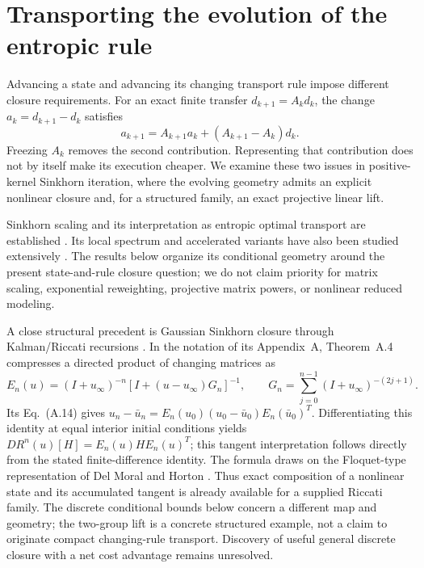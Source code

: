 \section{Transporting the evolution of the entropic rule}
\label{sec:entropic-evolution}
Advancing a state and advancing its changing transport rule impose different
closure requirements. For an exact finite transfer $d_{k+1}=A_kd_k$, the
change $a_k=d_{k+1}-d_k$ satisfies
\begin{equation}
 a_{k+1}=A_{k+1}a_k+(A_{k+1}-A_k)d_k.
 \label{eq:evolution-cocycle}
\end{equation}
Freezing $A_k$ removes the second contribution. Representing that contribution
does not by itself make its execution cheaper. We examine these two issues
in positive-kernel Sinkhorn iteration, where the evolving geometry admits
an explicit nonlinear closure and, for a structured family, an exact
projective linear lift.

Sinkhorn scaling and its interpretation as entropic optimal transport are
established \cite{peyre}. Its local spectrum and accelerated variants have
also been studied extensively \cite{lehmann}. The results below organize
its conditional geometry around the present state-and-rule closure question;
we do not claim priority for matrix scaling, exponential reweighting,
projective matrix powers, or nonlinear reduced modeling.

A close structural precedent is Gaussian Sinkhorn closure through
Kalman/Riccati recursions \cite{akyildiz}. In the notation of its
Appendix~A, Theorem~A.4 compresses a directed product of changing matrices as
\begin{equation}
 E_n(u)=(I+u_\infty)^{-n}
 [I+(u-u_\infty)G_n]^{-1},\qquad
 G_n=\sum_{j=0}^{n-1}(I+u_\infty)^{-(2j+1)}.
 \label{eq:prior-riccati-product}
\end{equation}
Its Eq.~(A.14) gives
$u_n-\bar u_n=E_n(u_0)(u_0-\bar u_0)E_n(\bar u_0)^T$.
Differentiating this identity at equal interior initial conditions yields
$D R^n(u)[H]=E_n(u)H E_n(u)^T$; this tangent interpretation follows directly
from the stated finite-difference identity. The formula draws on the
Floquet-type representation of Del Moral and Horton \cite{delmoralhorton}.
Thus exact composition of a nonlinear state and its accumulated tangent is
already available for a supplied Riccati family. The discrete conditional
bounds below concern a different map and geometry; the two-group lift is a
concrete structured example, not a claim to originate compact changing-rule
transport. Discovery of useful general discrete closure with a net cost
advantage remains unresolved.

